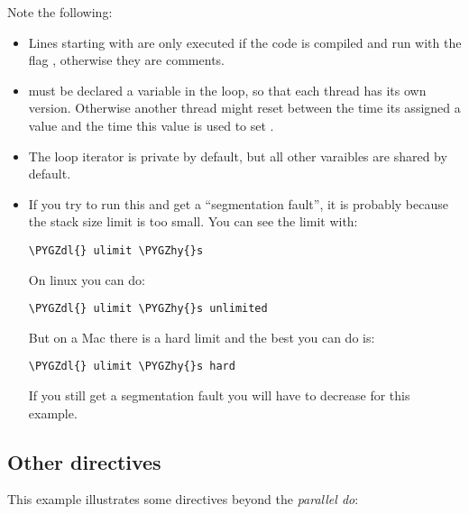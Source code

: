 \documentclass[letterpaper,10pt,english]{sphinxmanual}
\def\PYGZdl{\char`\$}
\def\PYGZhy{\char`\-}
\begin{document}
Note the following:
\begin{itemize}
\item {} 
Lines starting with \titleref{!\$} are only executed if the code is compiled and run
with the flag , otherwise they are comments.

\item {} 
 must be declared a  variable in the  loop,
so that each thread has its own version.  Otherwise another thread might
reset  between the time its assigned a value and the time this value is
used to set .

\item {} 
The loop iterator  is private by default, but all other varaibles
are shared by default.

\item {} 
If you try to run this and get a ``segmentation fault'', it is probably
because the stack size limit is too small.  You can see the limit with:

\begin{Verbatim}[commandchars=\\\{\}]
\PYGZdl{} ulimit \PYGZhy{}s
\end{Verbatim}

On linux you can do:

\begin{Verbatim}[commandchars=\\\{\}]
\PYGZdl{} ulimit \PYGZhy{}s unlimited
\end{Verbatim}

But on a Mac there is a hard limit and the best you can do is:

\begin{Verbatim}[commandchars=\\\{\}]
\PYGZdl{} ulimit \PYGZhy{}s hard
\end{Verbatim}

If you still get a segmentation fault you will have to decrease  for
this example.

\end{itemize}


\subsection{Other directives}
\label{openmp:other-directives}
This example illustrates some directives beyond the \emph{parallel do}:
\end{document}
